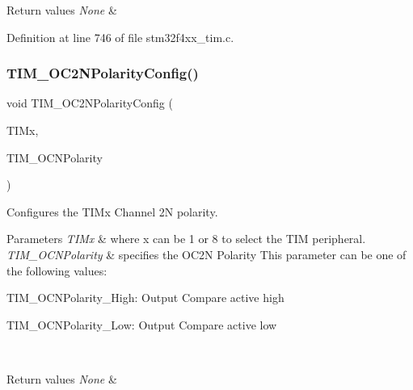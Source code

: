 \begin{DoxyRetVals}{Return values}
{\em None} & \\
\hline
\end{DoxyRetVals}


Definition at line 746 of file stm32f4xx\+\_\+tim.\+c.

\mbox{\label{group___t_i_m___group2_ga2fa6ea3a89f446b52b4e699272b70cad}} 
\subsubsection{\texorpdfstring{T\+I\+M\+\_\+\+O\+C2\+N\+Polarity\+Config()}{TIM\_OC2NPolarityConfig()}}
{\footnotesize\ttfamily void T\+I\+M\+\_\+\+O\+C2\+N\+Polarity\+Config (\begin{DoxyParamCaption}\item[{\hyperlink{struct_t_i_m___type_def}{T\+I\+M\+\_\+\+Type\+Def} $\ast$}]{T\+I\+Mx,  }\item[{uint16\+\_\+t}]{T\+I\+M\+\_\+\+O\+C\+N\+Polarity }\end{DoxyParamCaption})}



Configures the T\+I\+Mx Channel 2N polarity. 


\begin{DoxyParams}{Parameters}
{\em T\+I\+Mx} & where x can be 1 or 8 to select the T\+IM peripheral. \\
\hline
{\em T\+I\+M\+\_\+\+O\+C\+N\+Polarity} & specifies the O\+C2N Polarity This parameter can be one of the following values\+: \begin{DoxyItemize}
\item T\+I\+M\+\_\+\+O\+C\+N\+Polarity\+\_\+\+High\+: Output Compare active high \item T\+I\+M\+\_\+\+O\+C\+N\+Polarity\+\_\+\+Low\+: Output Compare active low \end{DoxyItemize}
\\
\hline
\end{DoxyParams}

\begin{DoxyRetVals}{Return values}
{\em None} & \\
\hline
\end{DoxyRetVals}


